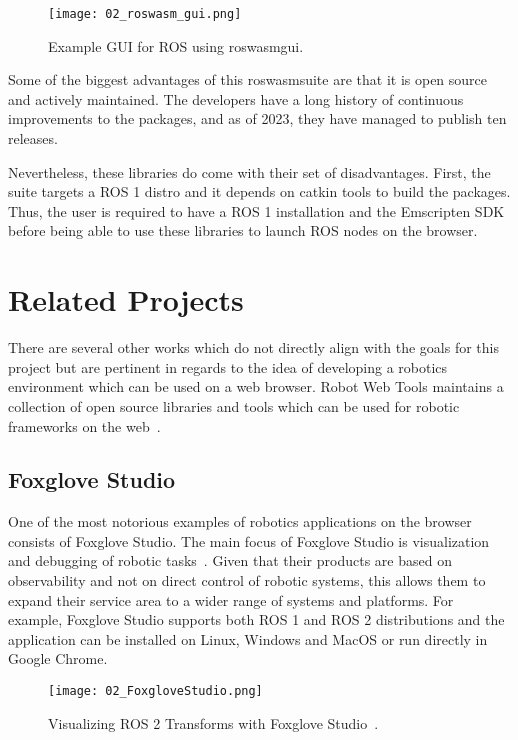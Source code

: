        \begin{figure}[htbp]
            \centering
            \texttt{[image: 02\_roswasm\_gui.png]}
            \caption{Example \ac{GUI} for ROS using \textsf{roswasm\smallunderscore gui}.}
            \label{fig:roswasm_gui}
        \end{figure}

        Some of the biggest advantages of this \textsf{roswasm\smallunderscore suite} are that it is open source and actively maintained. The developers have a long history of continuous improvements to the packages, and as of 2023, they have managed to publish ten releases. 

        Nevertheless, these libraries do come with their set of disadvantages. First, the suite targets a \ac{ROS} 1 distro and it depends on \textsf{catkin} tools to build the packages. Thus, the user is required to have a \ac{ROS} 1 installation and the Emscripten \ac{SDK} before being able to use these libraries to launch \ac{ROS} nodes on the browser.


\section{Related Projects}

    There are several other works which do not directly align with the goals for this project but are pertinent in regards to the idea of developing a robotics environment which can be used on a web browser. Robot Web Tools maintains a collection of open source libraries and tools which can be used for robotic frameworks on the web~\cite{robotwebtools}.
    
    \subsection{Foxglove Studio}

        One of the most notorious examples of robotics applications on the browser consists of Foxglove Studio. The main focus of Foxglove Studio is visualization and debugging of robotic tasks~\cite{foxglove}. Given that their products are based on observability and not on direct control of robotic systems, this allows them to expand their service area to a wider range of systems and platforms. For example, Foxglove Studio supports both \ac{ROS} 1 and \ac{ROS} 2 distributions and the application can be installed on Linux, Windows and MacOS or run directly in Google Chrome.
        
        \begin{figure}[htbp]
            \centering
            \texttt{[image: 02\_FoxgloveStudio.png]}
            \caption{Visualizing ROS 2 Transforms with Foxglove Studio~\cite{transforms}.}
            \label{fig:foxglove}
        \end{figure}

